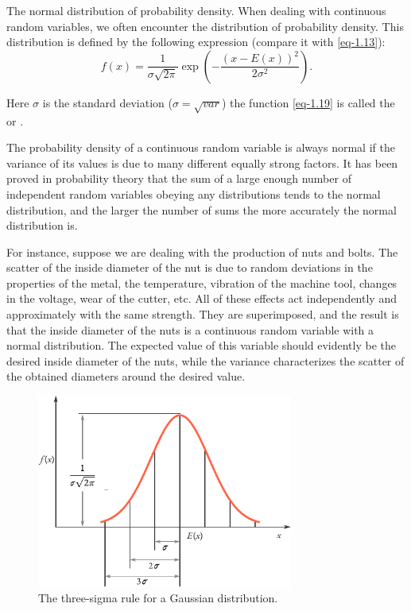 The normal distribution of probability density. When dealing with
continuous random variables, we often encounter the 
distribution of probability density. This distribution is defined by the
following expression (compare it with \eqref{eq-1.13}):
\begin{equation}
f(x) = \frac{1}{\sigma \sqrt{2 \pi}} \exp \left( - \frac{(x - E(x))^2}{2 \sigma ^{2}}\right).
\label{eq-1.19}
\end{equation}

Here $\sigma$ is the standard deviation ($\sigma = \sqrt{var}$) the
function \eqref{eq-1.19} is called the  or .

The probability density of a continuous random variable is always
normal if the variance of its values is due to many different equally
strong factors. It has been proved in probability theory that the sum of
a large enough number of independent random variables obeying any
distributions tends to the normal distribution, and the larger the number
of sums the more accurately the normal distribution is.



For instance, suppose we are dealing with the production of nuts and
bolts. The scatter of the inside diameter of the nut is due to random
deviations in the properties of the metal, the temperature, vibration of
the machine tool, changes in the voltage, wear of the cutter, etc. All of
these effects act independently and approximately with the same
strength. They are superimposed, and the result is that the inside
diameter of the nuts is a continuous random variable with a normal
distribution. The expected value of this variable should evidently be the
desired inside diameter of the nuts, while the variance characterizes the
scatter of the obtained diameters around the desired value.


\begin{figure}[!ht]
 \centering
 \includegraphics[width=0.75\textwidth]{figures/three-sigma.pdf}
\caption{The three-sigma rule for a Gaussian distribution.\label{three-sigma}}
 \end{figure}



